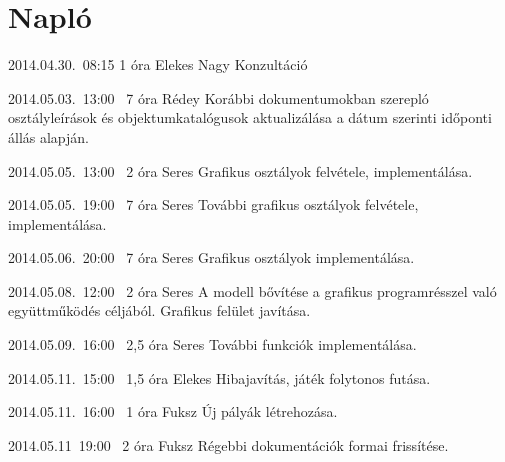 %
\section{Napló}

\begin{naplo}

\bejegyzes
{2014.04.30.~08:15}
{1 óra}
{Elekes
Nagy}
{Konzultáció}

\bejegyzes
{2014.05.03.~13:00~}
{7 óra}
{Rédey}
{Korábbi dokumentumokban szerepló osztályleírások és objektumkatalógusok aktualizálása a dátum szerinti időponti állás alapján.}

\bejegyzes
{2014.05.05.~13:00~}
{2 óra}
{Seres}
{Grafikus osztályok felvétele, implementálása.}

\bejegyzes
{2014.05.05.~19:00~}
{7 óra}
{Seres}
{További grafikus osztályok felvétele, implementálása.}

\bejegyzes
{2014.05.06.~20:00~}
{7 óra}
{Seres}
{Grafikus osztályok implementálása.}

\bejegyzes
{2014.05.08.~12:00~}
{2 óra}
{Seres}
{A modell bővítése a grafikus programrésszel való együttműködés céljából. Grafikus felület javítása.}

\bejegyzes
{2014.05.09.~16:00~}
{2,5 óra}
{Seres}
{További funkciók implementálása.}

\bejegyzes
{2014.05.11.~15:00~}
{1,5 óra}
{Elekes}
{Hibajavítás, játék folytonos futása.}

\bejegyzes
{2014.05.11.~16:00~}
{1 óra}
{Fuksz}
{Új pályák létrehozása.}

\bejegyzes
{2014.05.11~19:00~}
{2 óra}
{Fuksz}
{Régebbi dokumentációk formai frissítése.}



\end{naplo}

